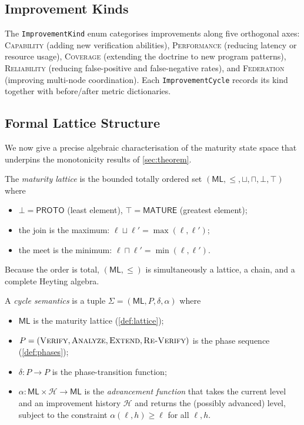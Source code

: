 \documentclass[11pt]{article}
\newcommand{\ML}{\mathsf{ML}}               %
\newcommand{\Proto}{\ensuremath{\mathsf{PROTO}}}
\newcommand{\Matur}{\ensuremath{\mathsf{MATURE}}}
\newcommand{\Verify}{\textsc{Verify}}
\newcommand{\Analyze}{\textsc{Analyze}}
\newcommand{\Extend}{\textsc{Extend}}
\newcommand{\ReVerify}{\textsc{Re-Verify}}
\begin{document}
\subsection{Improvement Kinds}

The \texttt{ImprovementKind} enum categorises improvements along five
orthogonal axes: \textsc{Capability} (adding new verification abilities),
\textsc{Performance} (reducing latency or resource usage),
\textsc{Coverage} (extending the doctrine to new program patterns),
\textsc{Reliability} (reducing false-positive and false-negative rates), and
\textsc{Federation} (improving multi-node coordination).  Each
\texttt{ImprovementCycle} records its kind together with before/after metric
dictionaries.

\subsection{Formal Lattice Structure}\label{sec:lattice}

We now give a precise algebraic characterisation of the maturity state space
that underpins the monotonicity results of \cref{sec:theorem}.

\begin{definition}\label{def:lattice}
The \emph{maturity lattice} is the bounded totally ordered set
$(\ML, \leq, \sqcup, \sqcap, \bot, \top)$ where
\begin{itemize}
  \item $\bot = \Proto$ (least element), $\top = \Matur$ (greatest element);
  \item the join is the maximum: $\ell \sqcup \ell' = \max(\ell, \ell')$;
  \item the meet is the minimum: $\ell \sqcap \ell' = \min(\ell, \ell')$.
\end{itemize}
Because the order is total, $(\ML, \leq)$ is simultaneously a lattice,
a chain, and a complete Heyting algebra.
\end{definition}

\begin{definition}\label{def:cycle-sem}
A \emph{cycle semantics} is a tuple
$\Sigma = (\ML, P, \delta, \alpha)$ where
\begin{itemize}
  \item $\ML$ is the maturity lattice (\cref{def:lattice});
  \item $P = (\Verify, \Analyze, \Extend, \ReVerify)$ is the phase sequence
    (\cref{def:phases});
  \item $\delta : P \to P$ is the phase-transition function;
  \item $\alpha : \ML \times \mathcal{H} \to \ML$ is the
    \emph{advancement function} that takes the current level and an
    improvement history $\mathcal{H}$ and returns the (possibly advanced)
    level, subject to the constraint
    $\alpha(\ell, h) \geq \ell$ for all $\ell, h$.
\end{itemize}
\end{definition}
\end{document}
